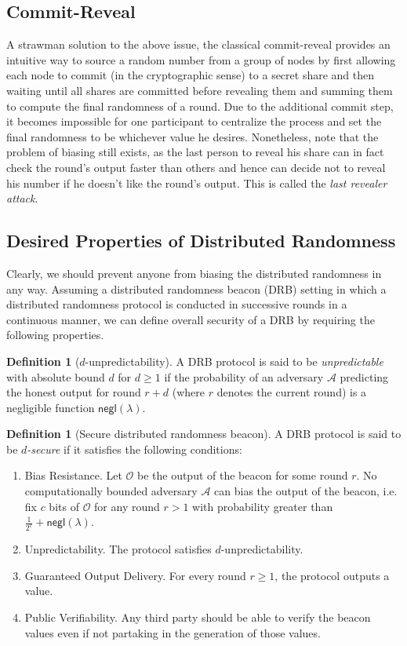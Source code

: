 \documentclass[letterpaper,twocolumn,10pt]{article}
\theoremstyle{definition}
\newtheorem{definition}[theorem]{Definition}
\theoremstyle{remark}
\begin{document}
\subsection{Commit-Reveal}
A strawman solution to the above issue, the classical commit-reveal provides an intuitive way to source a random number from a group of nodes by first allowing each node to commit (in the cryptographic sense) to a secret share and then waiting until all shares are committed before revealing them and summing them to compute the final randomness of a round. Due to the additional commit step, it becomes impossible for one participant to centralize the process and set the final randomness to be whichever value he desires. Nonetheless, note that the problem of biasing still exists, as the last person to reveal his share can in fact check the round's output faster than others and hence can decide not to reveal his number if he doesn't like the round's output. This is called the \textit{last revealer attack}.

\subsection{Desired Properties of Distributed Randomness}
Clearly, we should prevent anyone from biasing the distributed randomness in any way. Assuming a distributed randomness beacon (DRB) setting in which a distributed randomness protocol is conducted in successive rounds in a continuous manner, we can define overall security of a DRB by requiring the following properties.

\begin{definition}[$d$-unpredictability]
A DRB protocol is said to be \textit{unpredictable} with absolute bound $d$ for $d \geq 1$ if the probability of an adversary $\mathcal{A}$ predicting the honest output for round $r + d$ (where $r$ denotes the current round) is a negligible function $\mathsf{negl}(\lambda)$.
\end{definition}

\begin{definition}[Secure distributed randomness beacon]
A DRB protocol is said to be \textit{$d$-secure} if it satisfies the following conditions:
\begin{enumerate}
\item Bias Resistance. Let $\mathcal{O}$ be the output of the beacon for some round $r$. No computationally bounded adversary $\mathcal{A}$ can bias the output of the beacon, i.e. fix $c$ bits of $\mathcal{O}$ for any round $r > 1$ with probability greater than $\frac{1}{2^c} + \mathsf{negl}(\lambda)$.
\item Unpredictability. The protocol satisfies $d$-unpredictability.
\item Guaranteed Output Delivery. For every round $r \geq 1$, the protocol outputs a value.
\item Public Verifiability. Any third party should be able to verify the beacon values even if not partaking in the generation of those values.
\end{enumerate}
\end{definition}
\end{document}
